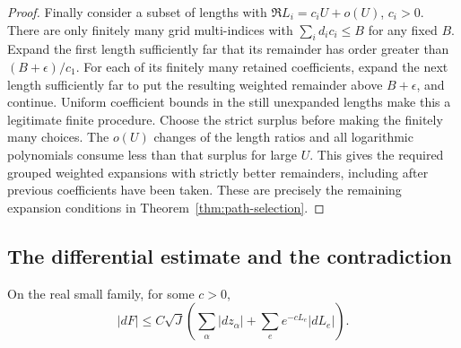 \begin{proof}
Finally consider a subset of lengths with
$\Re L_i=c_i U+o(U)$, $c_i>0$.  There are only finitely many
grid multi-indices with $\sum_i d_ic_i\le B$ for any fixed
$B$.  Expand the first length sufficiently far that its
remainder has order greater than $(B+\epsilon)/c_1$.
For each of its finitely many retained coefficients, expand
the next length sufficiently far to put the resulting
weighted remainder above $B+\epsilon$, and continue.
Uniform coefficient bounds in the still unexpanded lengths
make this a legitimate finite procedure.  Choose the
strict surplus before making the finitely many choices.
The $o(U)$ changes of the length ratios and all logarithmic
polynomials consume less than that surplus for large $U$.
This gives the required grouped weighted expansions with
strictly better remainders, including after previous
coefficients have been taken.  These are precisely the
remaining expansion conditions in
Theorem~\ref{thm:path-selection}.
\end{proof}

\subsection{The differential estimate and the contradiction}
\label{ell:conclusion}

\begin{lemma}
\label{ell:differential}
On the real small family, for some $c>0$,
\begin{equation}
 |dF|\le C\sqrt J\left(\sum_\alpha|dz_\alpha|
                 +\sum_e e^{-cL_e}|dL_e|\right).
 \label{ell:dF}
\end{equation}
\end{lemma}

